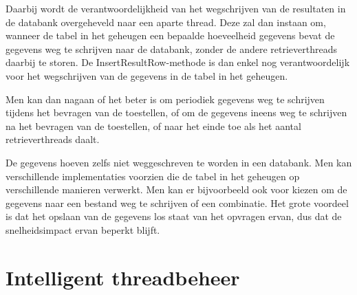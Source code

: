 Daarbij wordt de verantwoordelijkheid van het wegschrijven van de resultaten in de databank overgeheveld naar een aparte thread.
Deze zal dan instaan om, wanneer de tabel in het geheugen een bepaalde hoeveelheid gegevens bevat de gegevens weg te schrijven naar de databank,
zonder de andere retrieverthreads daarbij te storen.
De InsertResultRow-methode is dan enkel nog verantwoordelijk voor het wegschrijven van de gegevens in de tabel in het geheugen.

Men kan dan nagaan of het beter is om periodiek gegevens weg te schrijven tijdens het bevragen van de toestellen,
of om de gegevens ineens weg te schrijven na het bevragen van de toestellen, of naar het einde toe als het aantal retrieverthreads daalt.

De gegevens hoeven zelfs niet weggeschreven te worden in een databank.
Men kan verschillende implementaties voorzien die de tabel in het geheugen op verschillende manieren verwerkt.
Men kan er bijvoorbeeld ook voor kiezen om de gegevens naar een bestand weg te schrijven of een combinatie.
Het grote voordeel is dat het opslaan van de gegevens los staat van het opvragen ervan, dus dat de snelheidsimpact ervan beperkt blijft.


\section{Intelligent threadbeheer}


